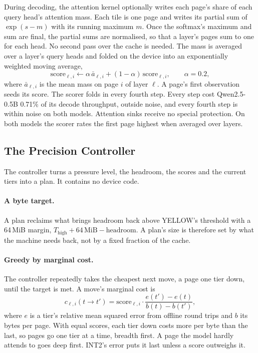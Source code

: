 \documentclass[11pt]{article}
\begin{document}
During decoding, the attention kernel optionally writes each page's share of
each query head's attention mass. Each tile is one page and writes its partial
sum of $\exp(s - m)$ with its running maximum $m$. Once the softmax's maximum
and sum are final, the partial sums are normalised, so that a layer's pages sum
to one for each head. No second pass over the cache is needed. The mass is
averaged over a layer's query heads and folded on the device into an
exponentially weighted moving average,
\begin{equation}
  \mathrm{score}_{\ell,i} \leftarrow \alpha\, \bar{a}_{\ell,i}
    + (1 - \alpha)\, \mathrm{score}_{\ell,i}, \qquad \alpha = 0.2,
\end{equation}
where $\bar{a}_{\ell,i}$ is the mean mass on page $i$ of layer $\ell$. A
page's first observation seeds its score. The scorer folds in every fourth
step. Every step cost Qwen2.5-0.5B 0.71\% of its decode throughput, outside
noise, and every fourth step is within noise on both models. Attention sinks
receive no special protection. On both models the scorer rates the first page
highest when averaged over layers.

\subsection{The Precision Controller}
\label{sec:controller}

The controller turns a pressure level, the headroom, the scores and the
current tiers into a plan. It contains no device code.

\paragraph{A byte target.} A plan reclaims what brings headroom back above
YELLOW's threshold with a 64\,MiB margin, $T_\mathrm{high} + 64\,\mathrm{MiB} -
\text{headroom}$. A plan's size is therefore set by what the machine needs
back, not by a fixed fraction of the cache.

\paragraph{Greedy by marginal cost.} The controller repeatedly takes the
cheapest next move, a page one tier down, until the target is met. A move's
marginal cost is
\begin{equation}
  c_{\ell,i}(t \to t') = \mathrm{score}_{\ell,i} \cdot
    \frac{e(t') - e(t)}{b(t) - b(t')},
\end{equation}
where $e$ is a tier's relative mean squared error from offline round trips
and $b$ its bytes per page. With equal scores, each tier down costs more per
byte than the last, so pages go one tier at a time, breadth first. A page the
model hardly attends to goes deep first. INT2's error puts it last unless a
score outweighs it.
\end{document}
